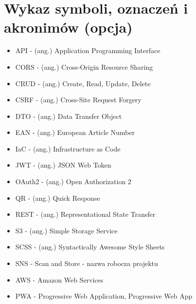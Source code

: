 \documentclass[../main.tex]{subfiles}
\begin{document}
\section{Wykaz symboli, oznaczeń i akronimów (opcja)}
        \begin{itemize}
            \item API - (ang.) Application Programming Interface
            \item CORS - (ang.) Cross-Origin Resource Sharing
            \item CRUD - (ang.) Create, Read, Update, Delete
            \item CSRF - (ang.) Cross-Site Request Forgery
            \item DTO - (ang.) Data Transfer Object
            \item EAN - (ang.) European Article Number
            \item IaC - (ang.) Infrastructure as Code 
            \item JWT - (ang.) JSON Web Token
            \item OAuth2 - (ang.) Open Authorization 2
            \item QR - (ang.) Quick Response
            \item REST - (ang.) Representational State Transfer
            \item S3 - (ang.) Simple Storage Service
            \item SCSS - (ang.) Syntactically Awesome Style Sheets
            \item SNS - Scan and Store - nazwa robocza projektu
            \item AWS - Amazon Web Services
            \item PWA - Progressive Web Application, Progressive Web App
        \end{itemize}
\end{document}
